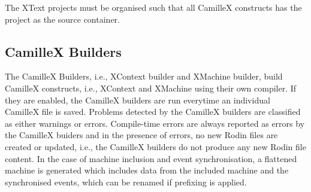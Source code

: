 The XText projects must be organised such that all CamilleX constructs has the project as the source container.

\subsection{CamilleX Builders}
\label{sec:xevent-b-builders}
The CamilleX Builders, i.e., XContext builder and XMachine builder, build CamilleX constructs, i.e., XContext and XMachine using their own compiler.  If they are enabled, the CamilleX builders are run everytime an individual CamilleX file is saved.  Problems detected by the CamilleX builders are classified as either warnings or errors.  Compile-time errors are always reported as errors by the CamilleX buiders and in the presence of errors, no new Rodin files are created or updated, i.e., the CamilleX builders do not produce any new Rodin file content. In the case of machine inclusion and event synchronisation, a flattened machine is generated which includes data from the included machine and the synchronised events, which can be renamed if prefixing is applied.

